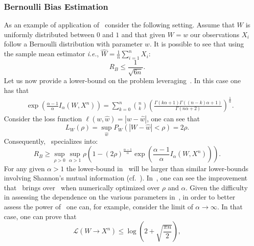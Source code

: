 \documentclass{article}
\numberwithin{theorem}{section}
\numberwithin{example}{section}
\numberwithin{remark}{section}
\numberwithin{definition}{section}
\newcommand{\ml}[2]{\mathcal{L}\left(#1  \!\!  \to  \!\!   #2\right)} %
\newcommand{\revised}[1]{{\color{black} #1}}
\begin{document}
\subsubsection{Bernoulli Bias Estimation}
As an example of application of~ consider the following setting. Assume that $W$ is uniformly distributed between $0$ and $1$ and that given $W=w$ our observations $X_i$ follow a Bernoulli distribution with parameter $w$. It is possible to see that \revised{using} the sample mean estimator \textit{i.e.}, $\hat{W} = \frac1n \sum_{i=1}^n X_i$: \begin{equation}R_B\leq \frac{1}{\sqrt{6n}}.\label{eq:bernoulliBiasUpperBound}\end{equation} Let us now provide a lower-bound on the problem leveraging~. In this case one has that \begin{equation}
		\begin{split}
		    &\exp\left(\frac{\alpha-1}{\alpha}I_\alpha(W,X^n)\right)= \sum_{k=0}^n \binom{n}{k}\left(\frac{\Gamma(k\alpha+1)\Gamma((n-k)\alpha+1)}{\Gamma(n\alpha+2)}\right)^\frac{1}{\alpha}.\label{eq:iAlphaBernoulliBiasValue}
		\end{split}
	\end{equation}
 Consider the loss function $\ell(w,\hat{w})=|w-\hat{w}|$, one can see that
    \begin{equation}
        L_W(\rho)=\sup_{\hat{w}}P_W(|W-\hat{w}|<\rho)=2\rho.
    \end{equation}
    Consequently,~ specializes into: \begin{equation}
		R_B\geq \sup_{\rho>0}\sup_{\alpha>1}\rho\left(1-(2\rho)^\frac{\alpha-1}{\alpha}\exp\left(\frac{\alpha-1}{\alpha}I_\alpha(W,X^n)\right)\right) \label{eq:iAlphaBernoulliBias}.
	\end{equation}
For any given $\alpha>1$ the lower-bound in~ will be larger than similar lower-bounds involving Shannon's mutual information (cf.~\cite{XuR:17}). In~, one can see the improvement that~ brings over~\cite[Equation 19)]{XuR:17} when numerically optimized over $\rho$ and $\alpha$. Given the difficulty in assessing the dependence on the various parameters in~, in order to better assess the power of~ one can, for example, consider the limit of $\alpha\to\infty$. In that case, one can prove that \begin{equation}
        \ml{W}{X^n} \leq \log\left(2+\sqrt{\frac{\pi n}{2}}\right),\label{eq:upperBoundLeakageBernoulliBias}
    \end{equation}
\end{document}
